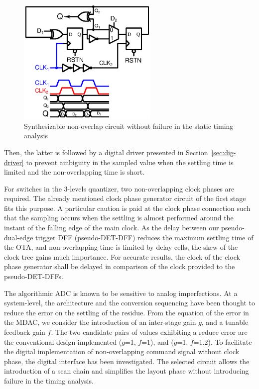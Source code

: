 \begin{figure}[htp]
	\centering
	\includegraphics[width=0.6\textwidth]{Chapter4/Figs/det-dff-hildebrandt.ps}
	\caption{Synthesizable non-overlap circuit without failure in the static timing analysis}
	\label{fig:digital-non-overlap}
\end{figure}

Then, the latter is followed by a digital driver presented in Section~\ref{sec:dig-driver} to prevent ambiguity in the sampled value when the settling time is limited and the non-overlapping time is short.

For switches in the 3-levels quantizer, two non-overlapping clock phases are required. The already mentioned clock phase generator circuit of the first stage fits this purpose. A particular caution is paid at the clock phase connection such that the sampling occurs when the settling is almost performed around the instant of the falling edge of the main clock. As the delay between our pseudo-dual-edge trigger DFF (pseudo-DET-DFF) reduces the maximum settling time of the OTA, and non-overlapping time is limited by delay cells, the skew of the clock tree gains much importance. For accurate results, the clock of the clock phase generator shall be delayed in comparison of the clock provided to the pseudo-DET-DFFs.

The algorithmic ADC is known to be sensitive to analog imperfections. At a system-level, the architecture and the conversion sequencing have been thought to reduce the error on the settling of the residue. From the equation of the error in the MDAC, we consider the introduction of an inter-stage gain $g$, and a tunable feedback gain $f$. The two candidate pairs of values exhibiting a reduce error are the conventional design implemented ($g$=1, $f$=1), and ($g$=1, $f$=1.2).
To facilitate the digital implementation of non-overlapping command signal without clock phase, the digital interface has been investigated. The selected circuit allows the introduction of a scan chain and simplifies the layout phase without introducing failure in the timing analysis.
\clearpage
